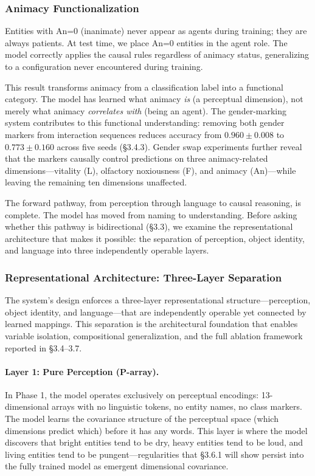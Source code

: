 \documentclass{article}
\begin{document}
\subsubsection{Animacy Functionalization}

Entities with An=0 (inanimate) never appear as agents during training; they are always patients. At test time, we place An=0 entities in the agent role. The model correctly applies the causal rules regardless of animacy status, generalizing to a configuration never encountered during training.

This result transforms animacy from a classification label into a functional category. The model has learned what animacy \emph{is} (a perceptual dimension), not merely what animacy \emph{correlates with} (being an agent). The gender-marking system contributes to this functional understanding: removing both gender markers from interaction sequences reduces accuracy from $0.960 \pm 0.008$ to $0.773 \pm 0.160$ across five seeds (\S3.4.3). Gender swap experiments further reveal that the markers causally control predictions on three animacy-related dimensions---vitality (L), olfactory noxiousness (F), and animacy (An)---while leaving the remaining ten dimensions unaffected.

The forward pathway, from perception through language to causal reasoning, is complete. The model has moved from naming to understanding. Before asking whether this pathway is bidirectional (\S3.3), we examine the representational architecture that makes it possible: the separation of perception, object identity, and language into three independently operable layers.

\subsubsection{Representational Architecture: Three-Layer Separation}

The system's design enforces a three-layer representational structure---perception, object identity, and language---that are independently operable yet connected by learned mappings. This separation is the architectural foundation that enables variable isolation, compositional generalization, and the full ablation framework reported in \S3.4--3.7.

\paragraph{Layer 1: Pure Perception (P-array).} In Phase 1, the model operates exclusively on perceptual encodings: 13-dimensional arrays with no linguistic tokens, no entity names, no class markers. The model learns the covariance structure of the perceptual space (which dimensions predict which) before it has any words. This layer is where the model discovers that bright entities tend to be dry, heavy entities tend to be loud, and living entities tend to be pungent---regularities that \S3.6.1 will show persist into the fully trained model as emergent dimensional covariance.
\end{document}
